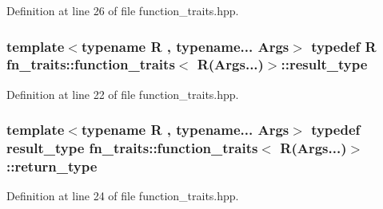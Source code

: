 Definition at line 26 of file function\+\_\+traits.\+hpp.

\subsubsection[{\texorpdfstring{result\+\_\+type}{result_type}}]{\setlength{\rightskip}{0pt plus 5cm}template$<$typename R , typename... Args$>$ typedef R {\bf fn\+\_\+traits\+::function\+\_\+traits}$<$ R(Args...)$>$\+::{\bf result\+\_\+type}}\hypertarget{structfn__traits_1_1function__traits_3_01_r_07_args_8_8_8_08_4_a1b509243ed1b4707465625de10e6c6bb}{}\label{structfn__traits_1_1function__traits_3_01_r_07_args_8_8_8_08_4_a1b509243ed1b4707465625de10e6c6bb}


Definition at line 22 of file function\+\_\+traits.\+hpp.

\subsubsection[{\texorpdfstring{return\+\_\+type}{return_type}}]{\setlength{\rightskip}{0pt plus 5cm}template$<$typename R , typename... Args$>$ typedef {\bf result\+\_\+type} {\bf fn\+\_\+traits\+::function\+\_\+traits}$<$ R(Args...)$>$\+::{\bf return\+\_\+type}}\hypertarget{structfn__traits_1_1function__traits_3_01_r_07_args_8_8_8_08_4_adf6a35a9b703dfb4778e59f132e00a9b}{}\label{structfn__traits_1_1function__traits_3_01_r_07_args_8_8_8_08_4_adf6a35a9b703dfb4778e59f132e00a9b}


Definition at line 24 of file function\+\_\+traits.\+hpp.

